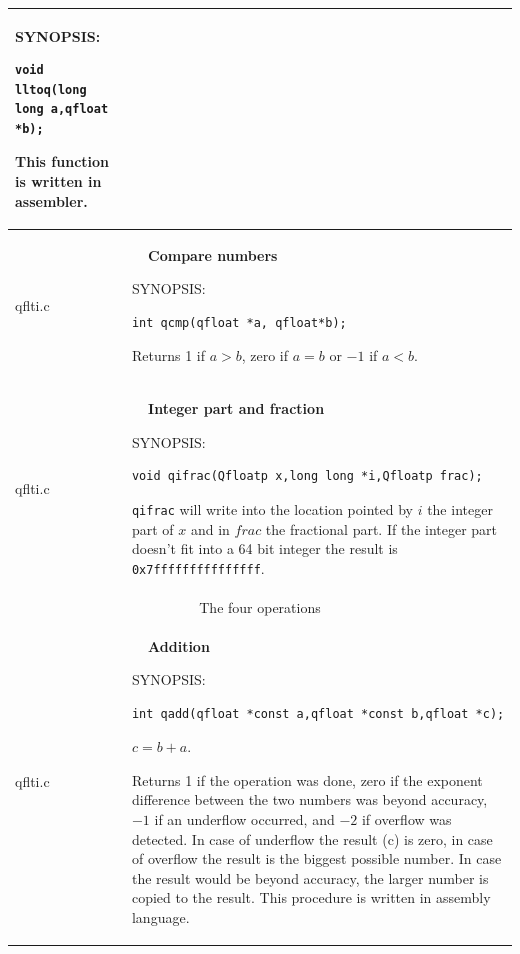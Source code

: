 \documentclass[10pt,a4paper,x11names]{memoir} %
\newcounter{entry}
\newcommand{\TOC}[1] {\addcontentsline{toc}{section}{\theentry\ \  #1} \textbf{\theentry\ \  #1} \par\stepcounter{entry}}
\begin{document}
\begin{longtable}{|p{1.5cm}|p{11.5cm}|}
	{\footnotesize SYNOPSIS:}\vspace{-0.2cm}\index{lltoq}
	\begin{lstlisting}[numbers=none]
		void lltoq(long long a,qfloat *b);
	\end{lstlisting}\vspace{-0.2cm} \par
	This function is written in assembler.
	\\\hline
	qflti.c& \TOC{Compare numbers}
	
	{\footnotesize SYNOPSIS:}\vspace{-0.2cm}\index{qcmp}
	\begin{lstlisting}[numbers=none]
		int qcmp(qfloat *a, qfloat*b);
	\end{lstlisting}\vspace{-0.2cm} \par
	Returns 1 if $a> b$, zero if $a = b$ or $-1$ if $a<b$.
	\\\hline
	qflti.c& \TOC{Integer part and fraction}
	
	{\footnotesize SYNOPSIS:}\vspace{-0.2cm}\index{qifrac}
	\begin{lstlisting}[numbers=none]
		void qifrac(Qfloatp x,long long *i,Qfloatp frac);
	\end{lstlisting}\vspace{-0.2cm} \par
	\verb,qifrac, will write into the location pointed by $i$ the integer part of $x$ and in $frac$ the fractional part. If the integer part doesn't fit into a 64 bit integer the result is \verb,0x7fffffffffffffff,.
	\\\hline
	\multicolumn{2}{c}{The four operations}
	\\\hline
	qflti.c& \TOC{Addition}\index{qadd}
	
	{\footnotesize SYNOPSIS:}\vspace{-0.2cm}
	\begin{lstlisting}[numbers=none]
		int qadd(qfloat *const a,qfloat *const b,qfloat *c);
	\end{lstlisting}\vspace{-0.2cm} $ c=b+a$.\par
	Returns 1 if the operation was done, zero if the exponent difference between the two numbers was beyond accuracy, $-1$ if an underflow occurred, and $-2$ if overflow was detected. In case of underflow the result (c) is zero, in case of overflow the result is the biggest possible number. In case the result would be beyond accuracy, the larger number is copied to the result.
	This procedure is written in assembly language.
	\\\hline
	

\end{longtable}
\end{document}
